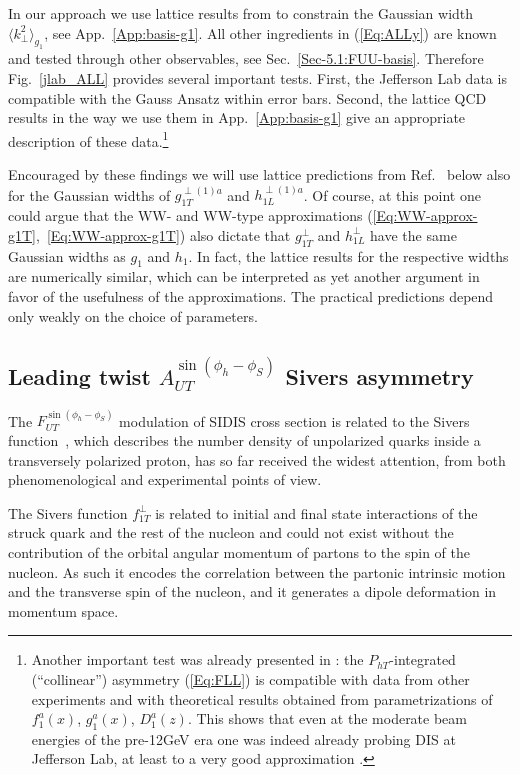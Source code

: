 \documentclass[a4paper,11pt]{article}
\newcommand{\la}{\langle}
\newcommand{\ra}{\rangle}
\def\Phperp{P_{hT}}
\def\kperp{k_\perp}
\begin{document}
In our approach we use lattice results from \cite{Hagler:2009mb} to
constrain the Gaussian width $\la\kperp^2\ra_{g_1}$, see App.~\ref{App:basis-g1}.
All other ingredients in (\ref{Eq:ALLy}) are known and 
tested through other observables, see Sec.~\ref{Sec-5.1:FUU-basis}.
Therefore Fig.~\ref{jlab_ALL} provides several important tests.
First, the Jefferson Lab data \cite{Avakian:2010ae} is compatible
with the Gauss Ansatz within error bars. Second, the lattice QCD results 
in the way we use them in App.~\ref{App:basis-g1} give an appropriate 
description of these data.\footnote{
	Another important test was already presented in 
	\cite{Avakian:2010ae}: the $\Phperp$-integrated (``collinear'')
	asymmetry (\ref{Eq:FLL}) is compatible with data
	from other experiments and with theoretical results obtained from
	parametrizations of $f_1^a(x)$, $g_1^a(x)$, $D_1^a(z)$. This 
	shows that even at the moderate beam energies of the pre-12GeV era 
	one was indeed already probing DIS at Jefferson Lab,
	at least to a very good approximation \cite{Avakian:2010ae}.}

Encouraged by these findings we will use lattice predictions from 
Ref.~\cite{Hagler:2009mb} below also for the Gaussian widths of 
$g_{1T}^{\perp(1)a}$ and $h_{1L}^{\perp(1)a}$.
Of course, at this point one could argue that the WW- and WW-type 
approximations (\ref{Eq:WW-approx-g1T},~\ref{Eq:WW-approx-g1T}) also
dictate that $g_{1T}^\perp$ and $h_{1L}^\perp$ have the same Gaussian
widths as $g_1$ and $h_1$. In fact, the lattice results for the 
respective widths are numerically similar, which can be interpreted as 
yet another argument in favor of the usefulness of the approximations. 
The practical predictions depend only weakly on the choice of parameters.

\newpage
\subsection{\boldmath Leading twist $A_{UT}^{\sin(\phi_h-\phi_S)}$ Sivers asymmetry}
\label{Sec-5.3:Sivers-basis}

The $F_{UT}^{\sin(\phi_h-\phi_S)}$ modulation of SIDIS cross section is related to  the Sivers function~\cite{Sivers:1989cc}, which describes the number density of unpolarized quarks inside a 
transversely polarized proton, has so far received the widest attention, 
from both phenomenological and experimental points of view. 

The Sivers function $f_{1T}^\perp$ is related to initial and final state interactions of the struck quark and the rest of the nucleon and could not exist 
without the contribution of the orbital angular momentum of partons to the spin of the nucleon. 
As such it encodes the correlation between the partonic intrinsic motion and the transverse spin of the nucleon, and it generates a dipole deformation in momentum space.
\end{document}
